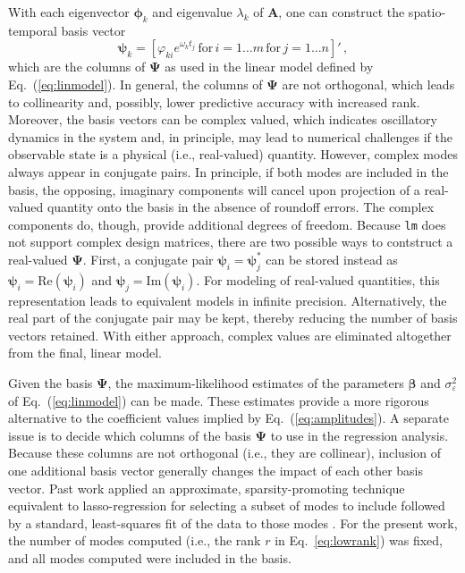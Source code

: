 \documentclass[review,number,sort&compress,12pt]{elsarticle}
\begin{document}
With each eigenvector $\boldsymbol{\phi}_k$ and eigenvalue $\lambda_k$ of $\mathbf{A}$, one can construct the spatio-temporal basis vector
\begin{equation}
  \boldsymbol{\psi}_k = 
    [\varphi_{ki} e^{\omega_k t_j} \, \text{for} \, i =1\ldots m \, \text{for} \, j = 1\ldots n]' \, ,
\end{equation}
which are the columns of $\boldsymbol{\Psi}$ as used in the linear model defined by Eq.~(\ref{eq:linmodel}).
In general, the columns of $\boldsymbol{\Psi}$ are not orthogonal, which leads to collinearity and, possibly, lower predictive accuracy with increased rank.  
Moreover, the basis vectors can be complex valued, which indicates oscillatory dynamics in the system and, in principle, may lead to  numerical challenges if the observable state is a physical (i.e., real-valued) quantity.
However, complex modes always appear in conjugate pairs. 
In principle, if both modes are included in the basis, the opposing, imaginary components will cancel upon projection of a real-valued quantity onto the basis in the absence of roundoff errors.
The complex components do, though, provide additional degrees of freedom.
Because {\tt lm} does not support complex design matrices, there are two possible ways to contstruct a real-valued $\boldsymbol{\Psi}$.
First, a conjugate pair $\boldsymbol{\psi}_i = \boldsymbol{\psi}^*_j$ can be stored instead as $\boldsymbol{\psi}_i = \text{Re}(\boldsymbol{\psi}_i)$ and $\boldsymbol{\psi}_j = \text{Im}(\boldsymbol{\psi}_i)$.
For modeling of real-valued quantities, this representation leads to equivalent models in infinite precision.
Alternatively, the real part of the conjugate pair may be kept, thereby reducing the number of basis vectors retained.  
With either approach, complex values are eliminated altogether from the final, linear model.


Given the basis $\boldsymbol{\Psi}$, the maximum-likelihood estimates of the parameters $\boldsymbol{\beta}$ and $\sigma^2_{\varepsilon}$ of Eq.~(\ref{eq:linmodel}) can be made.
These estimates provide a more rigorous alternative to the coefficient values implied by Eq.~(\ref{eq:amplitudes}).  
A separate issue is to decide which columns of the basis $\boldsymbol{\Psi}$ to use in the regression analysis.
Because these columns are not orthogonal (i.e., they are collinear), inclusion of one additional basis vector generally changes the impact of each other basis vector.
Past work applied an approximate, sparsity-promoting technique equivalent to lasso-regression for selecting a subset of modes to include followed by a standard, least-squares fit of the data to those modes \cite{jovanovic}.
For the present work, the number of modes computed (i.e., the rank $r$ in Eq.~\ref{eq:lowrank}) was fixed, and all modes computed were included in the basis.
\end{document}
